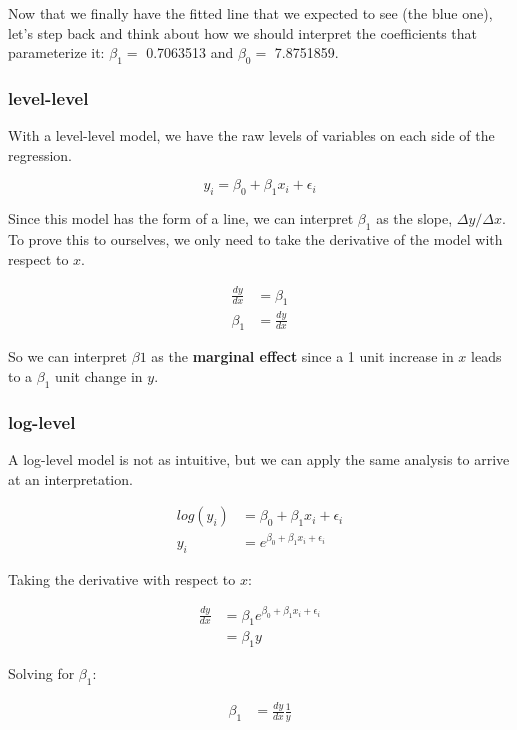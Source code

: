 \documentclass[10pt]{article}\usepackage[]{graphicx}\usepackage[]{color}
\begin{document}
Now that we finally have the fitted line that we expected to see (the blue one), let's step back and think about how we should interpret the coefficients that parameterize it: $\beta_1 =$ 0.7063513 and $\beta_0 =$ 7.8751859.

\subsubsection*{level-level}

With a level-level model, we have the raw levels of variables on each side of the regression.

$$ y_i = \beta_0 + \beta_1 x_i + \epsilon_i $$

Since this model has the form of a line, we can interpret $\beta_1$ as the slope, $\Delta y / \Delta x$. To prove this to ourselves, we only need to take the derivative of the model with respect to $x$.

\begin{align}
\frac{dy}{dx} &=\beta_1 \\
\beta_1 &= \frac{dy}{dx}
\end{align}

So we can interpret $\beta1$ as the {\bf marginal effect} since a 1 unit increase in $x$ leads to a $\beta_1$ unit change in $y$.

\subsubsection*{log-level}

A log-level model is not as intuitive, but we can apply the same analysis to arrive at an interpretation.

\begin{align}
log(y_i) &=  \beta_0 + \beta_1 x_i + \epsilon_i \\
y_i &= e^{\beta_0 + \beta_1 x_i + \epsilon_i}
\end{align}

Taking the derivative with respect to $x$:

\begin{align}
\frac{dy}{dx} &= \beta_1 e^{\beta_0 + \beta_1 x_i + \epsilon_i} \\
 &= \beta_1 y 
\end{align}

Solving for $\beta_1$:

\begin{align}
 \beta_1 &= \frac{dy}{dx} \frac{1}{y}
\end{align}
\end{document}
